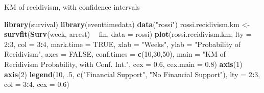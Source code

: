 \documentclass[ignorenonframetext,]{beamer}
\newenvironment{Shaded}{\begin{snugshade}}{\end{snugshade}}
\newcommand{\DataTypeTok}[1]{\textcolor[rgb]{0.13,0.29,0.53}{#1}}
\newcommand{\DecValTok}[1]{\textcolor[rgb]{0.00,0.00,0.81}{#1}}
\newcommand{\FloatTok}[1]{\textcolor[rgb]{0.00,0.00,0.81}{#1}}
\newcommand{\KeywordTok}[1]{\textcolor[rgb]{0.13,0.29,0.53}{\textbf{#1}}}
\newcommand{\NormalTok}[1]{#1}
\newcommand{\OperatorTok}[1]{\textcolor[rgb]{0.81,0.36,0.00}{\textbf{#1}}}
\newcommand{\OtherTok}[1]{\textcolor[rgb]{0.56,0.35,0.01}{#1}}
\newcommand{\StringTok}[1]{\textcolor[rgb]{0.31,0.60,0.02}{#1}}
\begin{document}
\begin{frame}[fragile]{%
\protect\hypertarget{km-of-recidivism-with-confidence-intervals}{%
KM of recidivism, with confidence intervals}}

\footnotesize

\begin{Shaded}
\begin{Highlighting}[]
\KeywordTok{library}\NormalTok{(survival)}
\KeywordTok{library}\NormalTok{(eventtimedata)}
\KeywordTok{data}\NormalTok{(}\StringTok{"rossi"}\NormalTok{)}
\NormalTok{rossi.recidivism.km <-}\StringTok{ }\KeywordTok{survfit}\NormalTok{(}\KeywordTok{Surv}\NormalTok{(week, arrest) }\OperatorTok{~}\StringTok{ }\NormalTok{fin, }
                               \DataTypeTok{data =}\NormalTok{ rossi)}
\KeywordTok{plot}\NormalTok{(rossi.recidivism.km, }\DataTypeTok{lty =} \DecValTok{2}\OperatorTok{:}\DecValTok{3}\NormalTok{, }\DataTypeTok{col =} \DecValTok{3}\OperatorTok{:}\DecValTok{4}\NormalTok{, }\DataTypeTok{mark.time =} \OtherTok{TRUE}\NormalTok{, }
     \DataTypeTok{xlab =} \StringTok{"Weeks"}\NormalTok{, }
     \DataTypeTok{ylab =} \StringTok{"Probability of Recidivism"}\NormalTok{, }
     \DataTypeTok{axes =} \OtherTok{FALSE}\NormalTok{, }
     \DataTypeTok{conf.times =} \KeywordTok{c}\NormalTok{(}\DecValTok{10}\NormalTok{,}\DecValTok{30}\NormalTok{,}\DecValTok{50}\NormalTok{),}
     \DataTypeTok{main =} \StringTok{"KM of Recidivism Probability, with Conf. Int."}\NormalTok{,}
     \DataTypeTok{cex =} \FloatTok{0.6}\NormalTok{, }\DataTypeTok{cex.main =} \FloatTok{0.8}\NormalTok{)}
\KeywordTok{axis}\NormalTok{(}\DecValTok{1}\NormalTok{)}
\KeywordTok{axis}\NormalTok{(}\DecValTok{2}\NormalTok{)}
\KeywordTok{legend}\NormalTok{(}\DecValTok{10}\NormalTok{, }\FloatTok{.5}\NormalTok{, }\KeywordTok{c}\NormalTok{(}\StringTok{"Financial Support"}\NormalTok{, }\StringTok{"No Financial Support"}\NormalTok{), }
       \DataTypeTok{lty =} \DecValTok{2}\OperatorTok{:}\DecValTok{3}\NormalTok{, }\DataTypeTok{col =} \DecValTok{3}\OperatorTok{:}\DecValTok{4}\NormalTok{, }\DataTypeTok{cex =} \FloatTok{0.6}\NormalTok{)}
\end{Highlighting}
\end{Shaded}

\end{frame}
\end{document}
